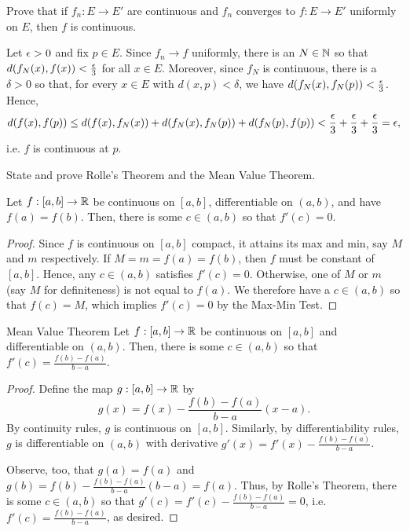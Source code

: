 \documentclass{article}
\begin{document}
\begin{problem}
Prove that if $f_n : E \to E'$ are continuous and $f_n$ converges to $f : E \to E'$ uniformly on $E$, then $f$ is continuous.
\begin{solution}
	Let $\epsilon > 0$ and fix $p \in E$.
	Since $f_n \to f$ uniformly, there is an $N \in \mathbb{N}$ so that $d(f_N(x), f(x)) < \frac{\epsilon}3$ for all $x \in E$.
	Moreover, since $f_N$ is continuous, there is a $\delta > 0$ so that, for every $x \in E$ with $d(x, p) < \delta$, we have $d(f_N(x), f_N(p)) < \frac{\epsilon}3$.
	Hence,
	\[
		d(f(x), f(p)) \le d(f(x), f_N(x)) + d(f_N(x), f_N(p)) + d(f_N(p), f(p)) < \frac{\epsilon}3 + \frac{\epsilon}3 + \frac{\epsilon}3 = \epsilon,
	\]
	i.e. $f$ is continuous at $p$.
\end{solution}
\end{problem}

\begin{problem}
State and prove Rolle's Theorem and the Mean Value Theorem.
\begin{solution}
	\begin{theorem*}[Rolle]
		Let $f : [a, b] \to \mathbb{R}$ be continuous on $[a, b]$, differentiable on $(a, b)$, and have $f(a) = f(b)$.
		Then, there is some $c \in (a, b)$ so that $f'(c) = 0$.
	\end{theorem*}
	\begin{proof}
		Since $f$ is continuous on $[a, b]$ compact, it attains its max and min, say $M$ and $m$ respectively.
		If $M = m = f(a) = f(b)$, then $f$ must be constant of $[a, b]$.
		Hence, any $c \in (a, b)$ satisfies $f'(c) = 0$.
		Otherwise, one of $M$ or $m$ (say $M$ for definiteness) is not equal to $f(a)$.
		We therefore have a $c \in (a, b)$ so that $f(c) = M$, which implies $f'(c) = 0$ by the Max-Min Test.
	\end{proof}

	\begin{theorem*}{Mean Value Theorem}
		Let $f : [a, b] \to \mathbb{R}$ be continuous on $[a, b]$ and differentiable on $(a, b)$.
		Then, there is some $c \in (a, b)$ so that $f'(c) = \frac{f(b) - f(a)}{b - a}$.
	\end{theorem*}
	\begin{proof}
		Define the map $g : [a, b] \to \mathbb{R}$ by
		\[
			g(x) = f(x) - \frac{f(b) - f(a)}{b - a} (x - a).
		\]
		By continuity rules, $g$ is continuous on $[a, b]$.
		Similarly, by differentiability rules, $g$ is differentiable on $(a, b)$ with derivative $g'(x) = f'(x) - \frac{f(b) - f(a)}{b - a}$.

		Observe, too, that $g(a) = f(a)$ and $g(b) = f(b) - \frac{f(b) - f(a)}{b - a}(b - a) = f(a)$.
		Thus, by Rolle's Theorem, there is some $c \in (a, b)$ so that $g'(c) = f'(c) - \frac{f(b) - f(a)}{b - a} = 0$, i.e. $f'(c) = \frac{f(b) - f(a)}{b - a}$, as desired.
	\end{proof}
\end{solution}
\end{problem}
\end{document}
